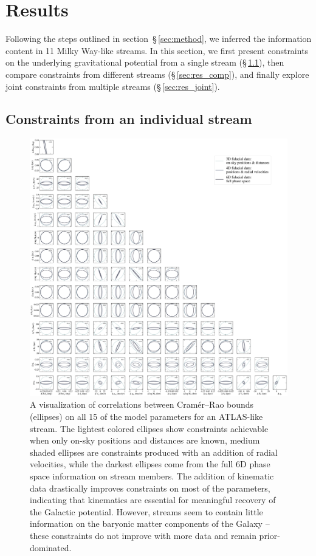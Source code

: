 \documentclass[modern]{aastex61}
\begin{document}
\section{Results}
\label{sec:results}
Following the steps outlined in section~\S\,\ref{sec:method}, we inferred the information content in 11 Milky Way-like streams.
In this section, we first present constraints on the underlying gravitational potential from a single stream (\S\,\ref{sec:res_ind}), then compare constraints from different streams (\S\,\ref{sec:res_comp}), and finally explore joint constraints from multiple streams (\S\,\ref{sec:res_joint}).

\subsection{Constraints from an individual stream}
\label{sec:res_ind}

\begin{figure}
\begin{center}
\includegraphics[width=\textwidth]{crb_correlations.pdf}
\caption{A visualization of correlations between Cram\'er--Rao bounds (ellipses) on all 15 of the model parameters for an ATLAS-like stream.
The lightest colored ellipses show constraints achievable when only on-sky positions and distances are known, medium shaded ellipses are constraints produced with an addition of radial velocities, while the darkest ellipses come from the full 6D phase space information on stream members.
The addition of kinematic data drastically improves constraints on most of the parameters, indicating that kinematics are essential for meaningful recovery of the Galactic potential.
However, streams seem to contain little information on the baryonic matter components of the Galaxy -- these constraints do not improve with more data and remain prior-dominated.
}
\label{fig:crb_correlations}
\end{center}
\end{figure}
\end{document}
